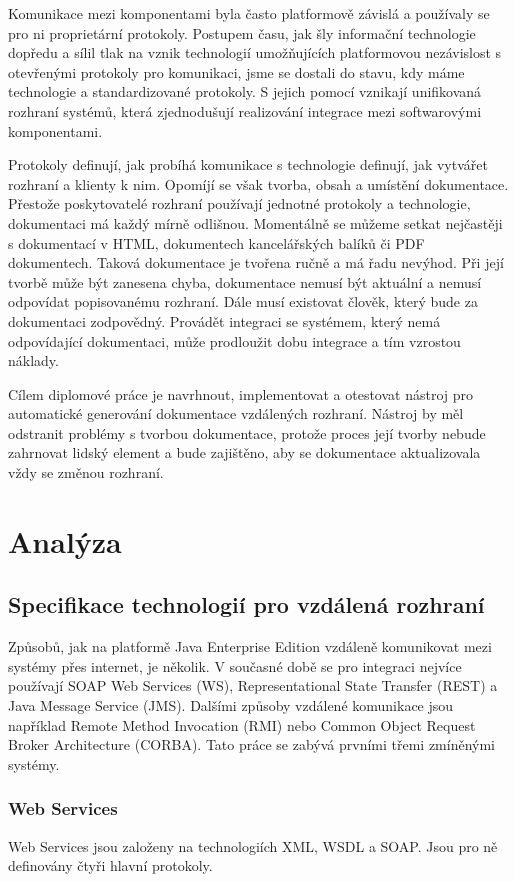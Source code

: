 \documentclass[11pt,twoside,a4paper]{book}
\begin{document}
Komunikace mezi komponentami byla často platformově závislá a používaly se pro ni
proprietární protokoly. Postupem času, jak šly informační technologie dopředu a sílil tlak na
vznik technologií umožňujících platformovou nezávislost s otevřenými protokoly pro
komunikaci, jsme se dostali do stavu, kdy máme technologie a standardizované
protokoly. S jejich pomocí vznikají unifikovaná rozhraní systémů, která
zjednodušují realizování integrace mezi softwarovými komponentami.

Protokoly definují, jak probíhá komunikace s technologie definují, jak vytvářet
rozhraní a klienty k nim. Opomíjí se však tvorba, obsah a umístění dokumentace.
Přestože poskytovatelé rozhraní používají jednotné protokoly a technologie,
dokumentaci má každý mírně odlišnou.
Momentálně se můžeme setkat nejčastěji s dokumentací v HTML, dokumentech
kancelářských balíků či PDF dokumentech. Taková dokumentace je tvořena ručně a má řadu
nevýhod. Při její tvorbě může být zanesena chyba, dokumentace nemusí být aktuální a nemusí
odpovídat popisovanému rozhraní. Dále musí existovat člověk, který bude za
dokumentaci zodpovědný. Provádět integraci se systémem, který nemá odpovídající
dokumentaci, může prodloužit dobu integrace a tím vzrostou náklady.

Cílem diplomové práce je navrhnout, implementovat a otestovat nástroj pro automatické
generování dokumentace vzdálených rozhraní. Nástroj by měl odstranit problémy s tvorbou
dokumentace, protože proces její tvorby nebude zahrnovat lidský element a bude zajištěno,
aby se dokumentace aktualizovala vždy se změnou rozhraní.

\chapter{Analýza}
\section{Specifikace technologií pro vzdálená rozhraní}
Způsobů, jak na platformě Java Enterprise Edition vzdáleně komunikovat mezi
systémy přes internet, je několik. V současné době se pro integraci nejvíce
používají SOAP Web Services (WS), Representational State Transfer (REST) a Java Message Service (JMS). Dalšími
způsoby vzdálené komunikace jsou například
Remote Method Invocation (RMI) nebo
Common Object Request Broker Architecture (CORBA). Tato práce se zabývá prvními třemi
zmíněnými systémy.


\subsection{Web Services}
Web Services jsou založeny na technologiích XML, WSDL a SOAP. Jsou pro ně
definovány čtyři hlavní protokoly.
\end{document}
